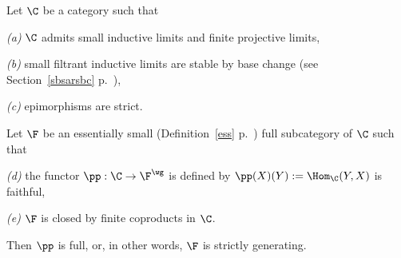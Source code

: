 \documentclass[12pt]{article}
\theoremstyle{remark}
\theoremstyle{definition}
\begin{document}



\begin{thm}[Theorem 5.3.6 p.~124] 
Let $\C$ be a category such that%

\nn\emph{(a)} $\C$ admits small inductive limits and finite projective limits, 

\nn\emph{(b)} small filtrant inductive limits are stable by base change (see Section~\ref{sbsarsbc} p.~), 

\nn\emph{(c)} epimorphisms are strict. 

\nn Let $\F$ be an essentially small (Definition~\ref{ess} p.~) full subcategory of $\C$ such that 

\nn\emph{(d)} the functor $\pp:\C\to\F^\wg$ is defined by $\pp(X)(Y):=\Hom_\C(Y,X)$ is faithful,

\nn\emph{(e)} $\F$ is closed by finite coproducts in $\C$. 

\nn Then $\pp$ is full, or, in other words, $\F$ is strictly generating.
\end{thm}

\end{document}
